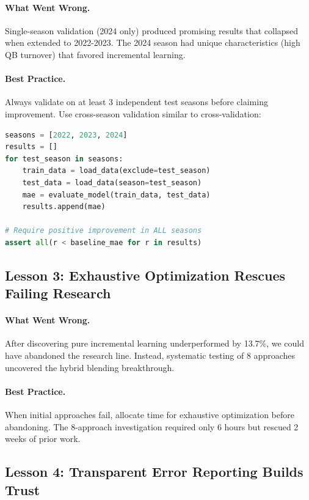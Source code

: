 \paragraph{What Went Wrong.} Single-season validation (2024 only) produced promising results that collapsed when extended to 2022-2023. The 2024 season had unique characteristics (high QB turnover) that favored incremental learning.

\paragraph{Best Practice.} Always validate on at least 3 independent test seasons before claiming improvement. Use cross-season validation similar to cross-validation:

\begin{lstlisting}[language=Python]
seasons = [2022, 2023, 2024]
results = []
for test_season in seasons:
    train_data = load_data(exclude=test_season)
    test_data = load_data(season=test_season)
    mae = evaluate_model(train_data, test_data)
    results.append(mae)

# Require positive improvement in ALL seasons
assert all(r < baseline_mae for r in results)
\end{lstlisting}

\subsection{Lesson 3: Exhaustive Optimization Rescues Failing Research}

\paragraph{What Went Wrong.} After discovering pure incremental learning underperformed by 13.7\%, we could have abandoned the research line. Instead, systematic testing of 8 approaches uncovered the hybrid blending breakthrough.

\paragraph{Best Practice.} When initial approaches fail, allocate time for exhaustive optimization before abandoning. The 8-approach investigation required only 6 hours but rescued 2 weeks of prior work.

\subsection{Lesson 4: Transparent Error Reporting Builds Trust}

